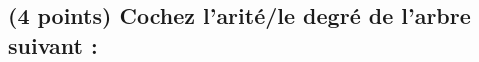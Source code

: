 \documentclass[11pt,a4paper]{article}
\begin{document}
\MakeExamTitle                   %




\renewcommand{\thesubsection}{\arabic{subsection}} %



\vfillFirst

\subsection{(4 points) Cochez l'arité/le degré de l'arbre suivant : }
\end{document}
